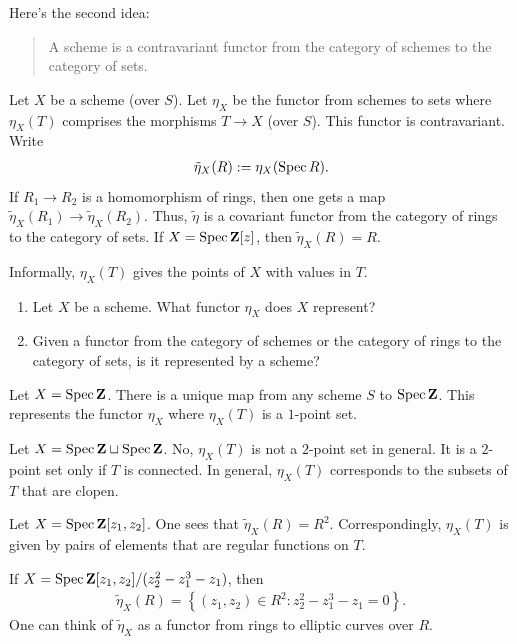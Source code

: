 \documentclass [11 pt, oneside] {article}
\begin{document}
Here's the second idea: 
\begin{quote}
	\small 
	A scheme is a contravariant functor from the category of schemes to the category of sets.
\end{quote}
Let $X$ be a scheme (over $S$). Let $\eta_X$ be the functor from schemes to sets where $\eta_X(T)$ comprises the morphisms $T\longrightarrow X$ (over $S$). This functor is contravariant. Write
\begin{align*}
	\tilde \eta_X(R) := \eta_X (\operatorname{Spec} R).
\end{align*}
If $R_1\longrightarrow R_2$ is a homomorphism of rings, then one gets a map $\tilde \eta_X(R_1)\longrightarrow \tilde \eta_X(R_2)$. Thus, $\tilde\eta$ is a covariant functor from the category of rings to the category of sets. If $X=\operatorname{Spec} \mathbf{Z}[z]$, then $\tilde \eta_X(R)=R$.

\begin{remark}
	Informally, $\eta_X(T)$ gives the points of $X$ with values in $T$.
\end{remark}

\begin{problem}\text{}
	\begin{enumerate}
		\item Let $X$ be a scheme. What functor $\eta_X$ does $X$ represent?
		\item Given a functor from the category of schemes or the category of rings to the category of sets, is it represented by a scheme?
	\end{enumerate}
\end{problem}

\begin{example}[ ]\label{}\text{}
Let $X=\operatorname{Spec} \mathbf{Z}$. There is a unique map from any scheme $S$ to $\operatorname{Spec} \mathbf{Z}$. This represents the functor $\eta_X$ where $\eta_X(T)$ is a $1$-point set.
\end{example}

\begin{example}[ ]\label{}\text{}
Let $X = \operatorname{Spec} \mathbf{Z}\sqcup \operatorname{Spec} \mathbf{Z}$. No, $\eta_X(T)$ is not a $2$-point set in general. It is a $2$-point set only if $T$ is connected. In general, $\eta_X(T)$ corresponds to the subsets of $T$ that are clopen.
\end{example}

\begin{example}[ ]\label{}\text{}
Let $X=\operatorname{Spec} \mathbf{Z}[z_1,z_2]$. One sees that $\tilde \eta_X(R) = R^2$. Correspondingly, $\eta_X(T)$ is given by pairs of elements that are regular functions on $T$.

If $X = \operatorname{Spec} \mathbf{Z}[z_1,z_2]/(z_2^2-z_1^3-z_1)$, then
\begin{align*}
	\tilde \eta_X(R) =  \left\{ (z_1,z_2)\in R^2 :  z_2^2-z_1^3-z_1=0\right\}.
\end{align*}
One can think of $\tilde\eta_X$ as a functor from rings to elliptic curves over $R$.
\end{example}
\end{document}

